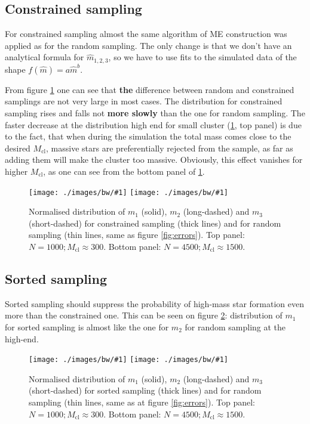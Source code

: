 \documentclass{aastex}
\newcommand{\Mcl}{M_{\mathrm{cl}}}
\newcommand{\includeEPSx}[1]{\texttt{[image: ./images/bw/\#1]}}
\begin{document}
\subsection{Constrained sampling}
For constrained sampling almost the same algorithm of ME construction was applied as for the random sampling. The only change is that we don't have an analytical formula for $\hat{m}_{1,2,3}$, so we have to use fits to the simulated data of the shape $f(\hat{m}) = a \hat{m}^b$.

From figure \ref{fig:compare2} one can see that \textbf{the} difference between random and constrained samplings are not very large in most cases. The distribution for constrained sampling rises and falls not\textbf{ more slowly} than the one for random sampling. The faster decrease at the distribution high end for small cluster (\ref{fig:compare2}, top panel) is due to the fact, that when during the simulation the total mass comes close to the desired $\Mcl$, massive stars are preferentially rejected from the sample, as far as adding them will make the cluster too massive. Obviously, this effect vanishes for higher $\Mcl$, as one can see from the bottom panel of \ref{fig:compare2}.	

\begin{figure}
  \begin{center}
   \includeEPSx{compare2.eps}
   \includeEPSx{compare2a.eps}
  \end{center}
 \caption{Normalised distribution of $m_1$ (solid), $m_2$ (long-dashed) and $m_3$ (short-dashed) for constrained sampling (thick lines) and for random sampling (thin lines, same as figure \ref{fig:errors}). Top panel: $N = 1000; \Mcl \approx 300$. Bottom panel:  $N = 4500; \Mcl \approx 1500$.  } \label{fig:compare2}
\end{figure}


\subsection{Sorted sampling}\label{sec:sorted}

Sorted sampling should suppress the probability of high-mass star formation even more than the constrained one. This can be seen on figure \ref{fig:compare3}: distribution of $m_1$ for sorted sampling is almost like the one for $m_2$ for random sampling at the high-end.

\begin{figure} 
  \begin{center}
   \includeEPSx{compare3.eps}
   \includeEPSx{compare3a.eps}
  \end{center}
 \caption{Normalised distribution of $m_1$ (solid), $m_2$ (long-dashed) and $m_3$ (short-dashed) for sorted sampling (thick lines) and for random sampling (thin lines, same as at figure \ref{fig:errors}). Top panel: $N = 1000; \Mcl \approx 300$. Bottom panel:  $N = 4500; \Mcl \approx 1500$.  }\label{fig:compare3}
\end{figure}
\end{document}

